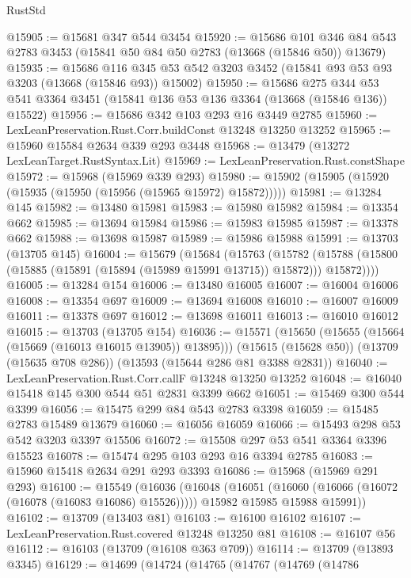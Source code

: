\begin{lexlean}{RustStd}
\begin{coremodule}
@15905 := @15681 @347 @544 @3454
@15920 := @15686
    @101
    @346
    @84
    @543
    @2783
    @3453
    (@15841 @50 @84 @50 @2783 (@13668 (@15846 @50)) @13679)
@15935 := @15686
    @116
    @345
    @53
    @542
    @3203
    @3452
    (@15841 @93 @53 @93 @3203 (@13668 (@15846 @93)) @15002)
@15950 := @15686
    @275
    @344
    @53
    @541
    @3364
    @3451
    (@15841 @136 @53 @136 @3364 (@13668 (@15846 @136)) @15522)
@15956 := @15686 @342 @103 @293 @16 @3449 @2785
@15960 := LexLeanPreservation.Rust.Corr.buildConst @13248 @13250 @13252
@15965 := @15960 @15584 @2634 @339 @293 @3448
@15968 := @13479 (@13272 LexLeanTarget.RustSyntax.Lit)
@15969 := LexLeanPreservation.Rust.constShape
@15972 := @15968 (@15969 @339 @293)
@15980 := @15902 (@15905 (@15920 (@15935 (@15950 (@15956 (@15965 @15972) @15872)))))
@15981 := @13284 @145
@15982 := @13480 @15981
@15983 := @15980 @15982
@15984 := @13354 @662
@15985 := @13694 @15984
@15986 := @15983 @15985
@15987 := @13378 @662
@15988 := @13698 @15987
@15989 := @15986 @15988
@15991 := @13703 (@13705 @145)
@16004 := @15679
    (@15684
      (@15763
        (@15782 (@15788 (@15800 (@15885 (@15891 (@15894 (@15989 @15991 @13715)) @15872))) @15872))))
@16005 := @13284 @154
@16006 := @13480 @16005
@16007 := @16004 @16006
@16008 := @13354 @697
@16009 := @13694 @16008
@16010 := @16007 @16009
@16011 := @13378 @697
@16012 := @13698 @16011
@16013 := @16010 @16012
@16015 := @13703 (@13705 @154)
@16036 := @15571
    (@15650 (@15655 (@15664 (@15669 (@16013 @16015 @13905)) @13895)))
    (@15615 (@15628 @50))
    (@13709 (@15635 @708 @286))
    (@13593 (@15644 @286 @81 @3388 @2831))
@16040 := LexLeanPreservation.Rust.Corr.callF @13248 @13250 @13252
@16048 := @16040 @15418 @145 @300 @544 @51 @2831 @3399 @662
@16051 := @15469 @300 @544 @3399
@16056 := @15475 @299 @84 @543 @2783 @3398
@16059 := @15485 @2783 @15489 @13679
@16060 := @16056 @16059
@16066 := @15493 @298 @53 @542 @3203 @3397 @15506
@16072 := @15508 @297 @53 @541 @3364 @3396 @15523
@16078 := @15474 @295 @103 @293 @16 @3394 @2785
@16083 := @15960 @15418 @2634 @291 @293 @3393
@16086 := @15968 (@15969 @291 @293)
@16100 := @15549
    (@16036
      (@16048
        (@16051 (@16060 (@16066 (@16072 (@16078 (@16083 @16086) @15526)))))
        @15982
        @15985
        @15988
        @15991))
@16102 := @13709 (@13403 @81)
@16103 := @16100 @16102
@16107 := LexLeanPreservation.Rust.covered @13248 @13250 @81
@16108 := @16107 @56
@16112 := @16103 (@13709 (@16108 @363 @709))
@16114 := @13709 (@13893 @3345)
@16129 := @14699
    (@14724
      (@14765
        (@14767
          (@14769
            (@14786

\end{coremodule}
\end{lexlean}
